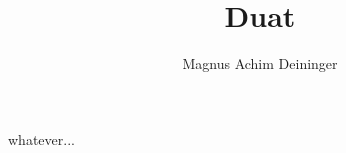 \documentclass[a4paper,twoside,titlepage]{article}
\title{Duat}
\author{Magnus Achim Deininger}
\begin{document}
whatever...
\end{document}
